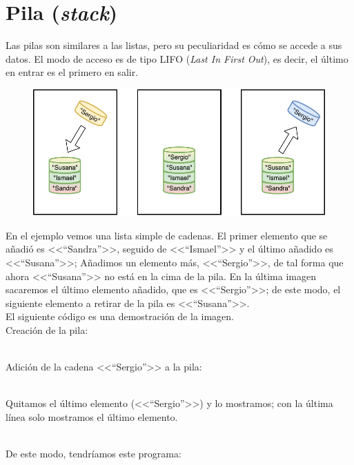 \documentclass[11pt, oneside]{book}		%
\begin{document}
	\section{Pila (\textit{stack})}
	Las pilas\cite{msdn:stack} son similares a las listas, pero su peculiaridad es cómo se accede a sus datos. El modo de acceso es de tipo LIFO (\textit{Last In First Out}), es decir, el último en entrar es el primero en salir.
	\begin{figure}[H]
		\centering
		\includegraphics{img/TiposEnumerables/Pila/pila1.pdf}
	\end{figure} 
	En el ejemplo vemos una lista simple de cadenas. El primer elemento que se añadió es <<``Sandra''>>, seguido de <<``Ismael''>> y el último añadido es <<``Susana''>>; Añadimos un elemento más, <<``Sergio''>>, de tal forma que ahora <<``Susana''>> no está en la cima de la pila. En la última imagen sacaremos el último elemento añadido, que es <<``Sergio''>>; de este modo, el siguiente elemento a retirar de la pila es <<``Susana''>>.\\
	El siguiente código es una demostración de la imagen.\\
	Creación de la pila:
	\\\\\begin{minipage}[c]{0.95\textwidth}
		
	\end{minipage}
	Adición de la cadena <<``Sergio''>> a la pila:
	\\\\\begin{minipage}[c]{0.95\textwidth}
		
	\end{minipage}
	Quitamos el último elemento (<<``Sergio''>>) y lo mostramos; con la última línea solo mostramos el último elemento.
	\\\\\begin{minipage}[c]{0.95\textwidth}
		
	\end{minipage}
	De este modo, tendríamos este programa:
	\\\\\begin{minipage}[c]{0.95\textwidth}
		
	\end{minipage}
\end{document}
